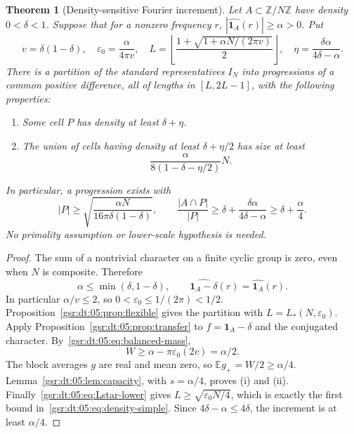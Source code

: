 \documentclass[11pt,letterpaper]{article}
\numberwithin{equation}{section}
\newtheorem{theorem}{Theorem}[section]
\theoremstyle{definition}
\theoremstyle{remark}
\newcommand{\E}{\mathbb E}
\newcommand{\Z}{\mathbb Z}
\newcommand{\one}{\mathbf 1}
\newcommand{\1}{\mathbf 1}
\newcommand{\eps}{\varepsilon}
\begin{document}
\begin{theorem}[Density-sensitive Fourier increment]
\label{gsr:dt:05:thm:density}
Let $A\subset\Z/N\Z$ have density $0<\delta<1$. Suppose that for a nonzero frequency $r$,
$|\widehat{\one_A}(r)|\geq\alpha>0$. Put
\begin{equation}
 v=\delta(1-\delta),\quad
 \eps_0=\frac\alpha{4\pi v},\quad
 L=\left\lfloor\frac{1+\sqrt{1+\alpha N/(2\pi v)}}2\right\rfloor,
 \quad \eta=\frac{\delta\alpha}{4\delta-\alpha}.
 \label{gsr:dt:05:eq:density-parameters}
\end{equation}
There is a partition of the standard representatives $I_N$ into progressions of a common positive difference, all of lengths in $[L,2L-1]$, with the following properties:
\begin{enumerate}[label=(\roman*)]
\item Some cell $P$ has density at least $\delta+\eta$.
\item The union of cells having density at least $\delta+\eta/2$ has size at least
\begin{equation}
 \frac{\alpha}{8(1-\delta-\eta/2)}N.
 \label{gsr:dt:05:eq:popular-A}
\end{equation}
\end{enumerate}
In particular, a progression exists with
\begin{equation}
 |P|\geq\sqrt{\frac{\alpha N}{16\pi\delta(1-\delta)}},\qquad
 \frac{|A\cap P|}{|P|}\geq\delta+\frac{\delta\alpha}{4\delta-\alpha}
 \geq\delta+\frac\alpha4.
 \label{gsr:dt:05:eq:density-simple}
\end{equation}
No primality assumption or lower-scale hypothesis is needed.
\end{theorem}
\begin{proof}
The sum of a nontrivial character on a finite cyclic group is zero, even when $N$ is composite. Therefore
\[
 \alpha\leq\min(\delta,1-\delta),\qquad
 \widehat{\one_A-\delta}(r)=\widehat{\one_A}(r).
\]
In particular $\alpha/v\leq2$, so $0<\eps_0\leq1/(2\pi)<1/2$. Proposition~\ref{gsr:dt:05:prop:flexible} gives the partition with $L=L_*(N,\eps_0)$. Apply Proposition~\ref{gsr:dt:05:prop:transfer} to $f=\one_A-\delta$ and the conjugated character. By~\eqref{gsr:dt:05:eq:balanced-mass},
\[
 W\geq\alpha-\pi\eps_0(2v)=\alpha/2.
\]
The block averages $g$ are real and mean zero, so $\E g_+=W/2\geq\alpha/4$. Lemma~\ref{gsr:dt:05:lem:capacity}, with $s=\alpha/4$, proves (i) and (ii). Finally~\eqref{gsr:dt:05:eq:Lstar-lower} gives $L\geq\sqrt{\eps_0N/4}$, which is exactly the first bound in~\eqref{gsr:dt:05:eq:density-simple}. Since $4\delta-\alpha\leq4\delta$, the increment is at least $\alpha/4$.
\end{proof}
\end{document}
